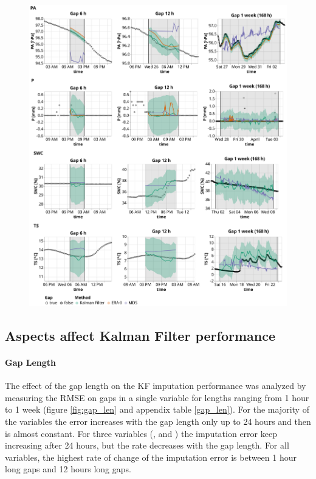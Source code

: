 \documentclass{article}
\newcommand{\imgwidth}{6in}
\let\Oldsubsection\subsection
\renewcommand{\subsection}{\FloatBarrier\Oldsubsection}
\begin{document}
\begin{figure}
\centerline{\includegraphics[width=\imgwidth]{timeseries_2_1}}
\caption{}
\label{fig:ts_1-2}
\end{figure}
\restoregeometry


\subsection{Aspects affect Kalman Filter performance}

\paragraph{Gap Length} The effect of the gap length on the KF imputation performance was analyzed by measuring the RMSE on gaps in a single variable for lengths ranging from 1 hour to 1 week (figure \ref{fig:gap_len} and appendix table \ref{gap_len}). For the majority of the variables the error increases with the gap length only up to 24 hours and then is almost constant. For three variables (,  and ) the imputation error keep increasing after 24 hours, but the rate decreases with the gap length. For all variables, the highest rate of change of the imputation error is between 1 hour long gaps and 12 hours long gaps.
\end{document}
